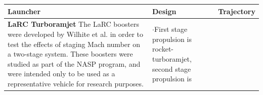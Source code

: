 \begin{xltabular}{\linewidth}{|X|X|X|}
	\hline \small  \textbf{Launcher} &\small \textbf{Design} &\small \textbf{Trajectory}\\ 
	\hline \small 
	\textbf{LaRC Turboramjet}\cite{Wilhite1991}\newline\newline
	The LaRC boosters were developed by Wilhite et al.\cite{Wilhite1991} in order to test the effects of staging Mach number on a two-stage system. These boosters were studied as part of the NASP program, and were intended only to be used as a representative vehicle for research purposes.  
	&\small
	
	$\cdot$First stage propulsion is rocket-turboramjet, second stage propulsion is
	&\small
	

\end{xltabular}
